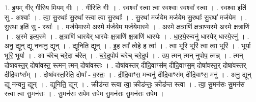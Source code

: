 \documentclass[17pt]{extarticle}
\begin{document}
1. इ॒यम् गीर् गीरि॒य मि॒यम् गीः । . गीरिति॒ गीः । . स्वश्वा᳚ स्त्वा त्वा॒ स्वश्वाः॒ स्वश्वा᳚ स्त्वा । . स्वश्वा॒ इति॑ सु - अश्वाः᳚ । . त्वा॒ सु॒रथाः᳚ सु॒रथा᳚ स्त्वा त्वा सु॒रथाः᳚ । . सु॒रथा॑ मर्जयेम मर्जयेम सु॒रथाः᳚ सु॒रथा॑ मर्जयेम । . सु॒रथा॒ इति॑ सु - रथाः᳚ । . म॒र्ज॒ये॒मा॒स्मे अ॒स्मे म॑र्जयेम मर्जयेमा॒स्मे । . अ॒स्मे क्ष॒त्राणि॑ क्ष॒त्राण्य॒स्मे अ॒स्मे क्ष॒त्राणि॑ । . अ॒स्मे इत्य॒स्मे । . क्ष॒त्राणि॑ धारयेर् धारयेः क्ष॒त्राणि॑ क्ष॒त्राणि॑ धारयेः । . धा॒र॒ये॒रन्वनु॑ धारयेर् धारये॒रनु॑ । . अनु॒ द्यून् द्यू नन्वनु॒ द्यून् । . द्यूनिति॒ द्यून् । . इ॒ह त्वा᳚ त्वे॒हे ह त्वा᳚ । . त्वा॒ भूरि॒ भूरि॑ त्वा त्वा॒ भूरि॑ । . भूर्या भूरि॒ भूर्या । . आ च॑रेच् चरे॒दा च॑रेत् । . च॒रे॒दुपोप॑ चरेच् चरे॒दुप॑ । . उप॒ त्मन् त्मन् नुपोप॒ त्मन्न् । . त्मन् दोषा॑वस्त॒र् दोषा॑वस्त॒ स्त्मन् त्मन् दोषा॑वस्तः । . दोषा॑वस्तर् दीदि॒वाꣳस॑म् दीदि॒वाꣳस॒म् दोषा॑वस्त॒र् दोषा॑वस्तर् दीदि॒वाꣳस᳚म् । . दोषा॑वस्त॒रिति॒ दोषा᳚ - व॒स्तः॒ । . दी॒दि॒वाꣳस॒ मन्वनु॑ दीदि॒वाꣳस॑म् दीदि॒वाꣳस॒ मनु॑ । . अनु॒ द्यून् द्यू नन्वनु॒ द्यून् । . द्यूनिति॒ द्यून् । . क्रीड॑न्त स्त्वा त्वा॒ क्रीड॑न्तः॒ क्रीड॑न्त स्त्वा । . त्वा॒ सु॒मन॑सः सु॒मन॑स स्त्वा त्वा सु॒मन॑सः । . सु॒मन॑सः सपेम सपेम सु॒मन॑सः सु॒मन॑सः सपेम । \newline
\end{document}
